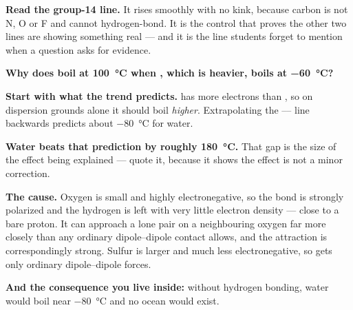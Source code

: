 \documentclass{apchem-worksheet}
\begin{document}
\begin{apctrap}
\textbf{Read the group-14 line.} It rises smoothly with no kink, because
carbon is not N, O or F and  cannot hydrogen-bond. It is the
control that proves the other two lines are showing something real ---
and it is the line students forget to mention when a question asks for
evidence.
\end{apctrap}

\begin{workedexample}
\textbf{Why does  boil at \SI{100}{\celsius} when ,
which is heavier, boils at \SI{-60}{\celsius}?}

\textbf{Start with what the trend predicts.}  has more electrons
than , so on dispersion grounds alone it should boil
\emph{higher}. Extrapolating the ---- line
backwards predicts about \SI{-80}{\celsius} for water.

\textbf{Water beats that prediction by roughly \SI{180}{\celsius}.} That
gap is the size of the effect being explained --- quote it, because it
shows the effect is not a minor correction.

\textbf{The cause.} Oxygen is small and highly electronegative, so the
 bond is strongly polarized and the hydrogen is left with very
little electron density --- close to a bare proton. It can approach a
lone pair on a neighbouring oxygen far more closely than any ordinary
dipole--dipole contact allows, and the attraction is correspondingly
strong. Sulfur is larger and much less electronegative, so  gets
only ordinary dipole--dipole forces.

\textbf{And the consequence you live inside:} without hydrogen bonding,
water would boil near \SI{-80}{\celsius} and no ocean would exist.
\end{workedexample}
\end{document}
